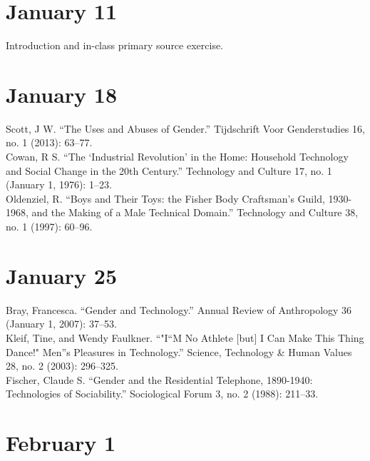\documentclass[11pt]{article}
\begin{document}
\small
\let\realeverypar\everypar
\realeverypar{\the\myeverypar\the\everypar}%
\newtoks\everypar %
\everypar{}
\newtoks\myeverypar \myeverypar{}

\myeverypar{\hangindent=1cm \small}

\section{January 11}

Introduction and in-class primary source exercise.

\section{January 18}

Scott, J W. “The Uses and Abuses of Gender.” Tijdschrift Voor Genderstudies 16, no. 1 (2013): 63–77. \\

Cowan, R S. “The ‘Industrial Revolution’ in the Home: Household Technology and Social Change in the 20th Century.” Technology and Culture 17, no. 1 (January 1, 1976): 1–23. \\

Oldenziel, R. “Boys and Their Toys: the Fisher Body Craftsman's Guild, 1930-1968, and the Making of a Male Technical Domain.” Technology and Culture 38, no. 1 (1997): 60–96.


\section{January 25}

Bray, Francesca. “Gender and Technology.” Annual Review of Anthropology 36 (January 1, 2007): 37–53. \\

Kleif, Tine, and Wendy Faulkner. “"I“M No Athlete [but] I Can Make This Thing Dance!" Men”s Pleasures in Technology.” Science, Technology \& Human Values 28, no. 2 (2003): 296–325.\\

Fischer, Claude S. “Gender and the Residential Telephone, 1890-1940: Technologies of Sociability.” Sociological Forum 3, no. 2 (1988): 211–33.

\section{February 1}
\end{document}
